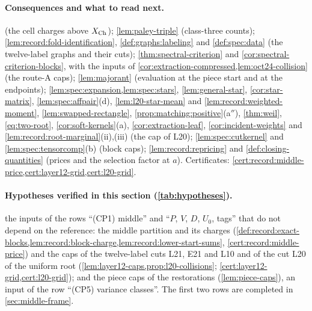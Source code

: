 \paragraph{Consequences and what to read next.}
 (the cell charges above $X_{\rm Ch}$); \cref{lem:paley-triple}
(class-three counts); \cref{lem:record:fold-identification},
\cref{def:graphs:labeling} and \cref{def:spec:data} (the twelve-label graphs
and their cuts); \cref{thm:spectral-criterion} and
\cref{cor:spectral-criterion-blocks}, with the inputs of
\cref{cor:extraction-compressed,lem:oct24-collision} (the route-A caps);
\cref{lem:majorant} (evaluation at the piece start and at the endpoints);
\cref{lem:spec:expansion,lem:spec:stars}, \cref{lem:general-star},
\cref{cor:star-matrix}, \cref{lem:spec:affpair}(d), \cref{lem:l20-star-mean} and
\cref{lem:record:weighted-moment}, \cref{lem:swapped-rectangle},
\cref{prop:matching:positive}(a$''$), \cref{thm:weil}, \eqref{eq:two-root},
\cref{cor:soft-kernels}(a), \cref{cor:extraction-leaf}, \cref{cor:incident-weights} and
\cref{lem:record:root-marginal}(ii),(iii) (the cap of L20);
\cref{lem:spec:cutkernel} and \cref{lem:spec:tensorcomp}(b) (block caps);
\cref{lem:record:repricing} and \cref{def:closing-quantities} (prices and the
selection factor at $a$). Certificates:
\cref{cert:record:middle-price,cert:layer12-grid,cert:l20-grid}.

\paragraph{Hypotheses verified in this section (\cref{tab:hypotheses}).} the inputs of the rows ``(CP1)
middle'' and ``$P$, $V$, $D$, $U_0$, tags'' that do not depend on the reference:
the middle partition and its charges
(\cref{def:record:exact-blocks,lem:record:block-charge,lem:record:lower-start-sums},
\cref{cert:record:middle-price}) and the caps of the twelve-label cuts L21, E21
and L10 and of the cut L20 of the uniform root
(\cref{lem:layer12-caps,prop:l20-collisions};
\cref{cert:layer12-grid,cert:l20-grid}); and the piece caps of the restorations
(\cref{lem:piece-caps}), an input of the row ``(CP5) variance classes''. The
first two rows are completed in \cref{sec:middle-frame}.
